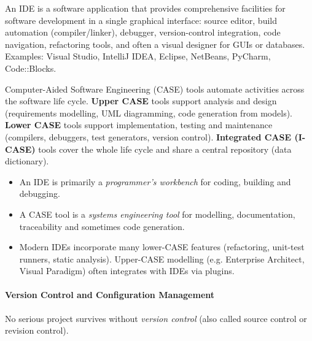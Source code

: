 \documentclass[11pt]{article}
\newcommand{\cle}[1]{{\popxbold\color{popdark}#1}}
\begin{document}
\begin{definition}
An \cle{IDE} is a software application that provides comprehensive facilities for software development in a single graphical interface: source editor, build automation (compiler/linker), debugger, version-control integration, code navigation, refactoring tools, and often a visual designer for GUIs or databases. Examples: Visual Studio, IntelliJ IDEA, Eclipse, NetBeans, PyCharm, Code::Blocks.
\end{definition}

\begin{definition}
\cle{Computer-Aided Software Engineering (CASE) tools} automate activities across the software life cycle. \textbf{Upper CASE} tools support analysis and design (requirements modelling, UML diagramming, code generation from models). \textbf{Lower CASE} tools support implementation, testing and maintenance (compilers, debuggers, test generators, version control). \textbf{Integrated CASE (I-CASE)} tools cover the whole life cycle and share a central repository (data dictionary).
\end{definition}

\begin{aretenir}
\begin{itemize}
\item An IDE is primarily a \emph{programmer's workbench} for coding, building and debugging.
\item A CASE tool is a \emph{systems engineering tool} for modelling, documentation, traceability and sometimes code generation.
\item Modern IDEs incorporate many lower-CASE features (refactoring, unit-test runners, static analysis). Upper-CASE modelling (e.g. Enterprise Architect, Visual Paradigm) often integrates with IDEs via plugins.
\end{itemize}
\end{aretenir}

\paragraph{Version Control and Configuration Management}
No serious project survives without \emph{version control} (also called source control or revision control).
\end{document}
